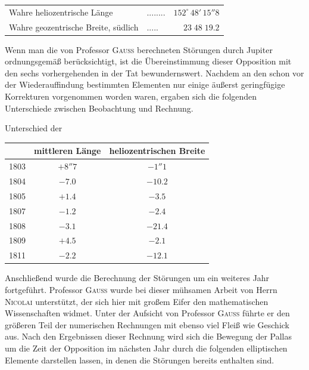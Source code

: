 \begin{center}\fontsize{10}{12}\selectfont\setlength{\tabcolsep}{4pt}\renewcommand{\arraystretch}{1.15}\begin{tabular}{llr}
Wahre heliozentrische Länge & .\;.\;.\;.\;.\;.\;.\;. & $152^\circ\,48'\,15''8$\\
Wahre geozentrische Breite, südlich & .\;.\;.\;.\;. & $23\;48\;19.2$\\
\end{tabular}\end{center}

\par\indent Wenn man die von Professor \textsc{Gauss} berechneten Störungen durch Jupiter ordnungsgemäß berücksichtigt, ist die Übereinstimmung dieser Opposition mit den sechs vorhergehenden in der Tat bewundernswert. Nachdem an den schon vor der Wiederauffindung bestimmten Elementen nur einige äußerst geringfügige Korrekturen vorgenommen worden waren, ergaben sich die folgenden Unterschiede zwischen Beobachtung und Rechnung.
\begin{center}\fontsize{10}{12}\selectfont\setlength{\tabcolsep}{4pt}\renewcommand{\arraystretch}{1.15}
Unterschied der

\begin{tabular}{c|c|c}
 & mittleren Länge & heliozentrischen Breite \\
\hline
1803 & $+8''7$ & $-1''1$ \\
1804 & $-7.0$ & $-10.2$ \\
1805 & $+1.4$ & $-3.5$ \\
1807 & $-1.2$ & $-2.4$ \\
1808 & $-3.1$ & $-21.4$ \\
1809 & $+4.5$ & $-2.1$ \\
1811 & $-2.2$ & $-12.1$ \\
\end{tabular}
\end{center}


\par\indent Anschließend wurde die Berechnung der Störungen um ein weiteres Jahr fortgeführt. Professor \textsc{Gauss} wurde bei dieser mühsamen Arbeit von Herrn \textsc{Nicolai} unterstützt, der sich hier mit großem Eifer den mathematischen Wissenschaften widmet. Unter der Aufsicht von Professor \textsc{Gauss} führte er den größeren Teil der numerischen Rechnungen mit ebenso viel Fleiß wie Geschick aus. Nach den Ergebnissen dieser Rechnung wird sich die Bewegung der Pallas um die Zeit der Opposition im nächsten Jahr durch die folgenden elliptischen Elemente darstellen lassen, in denen die Störungen bereits enthalten sind.

